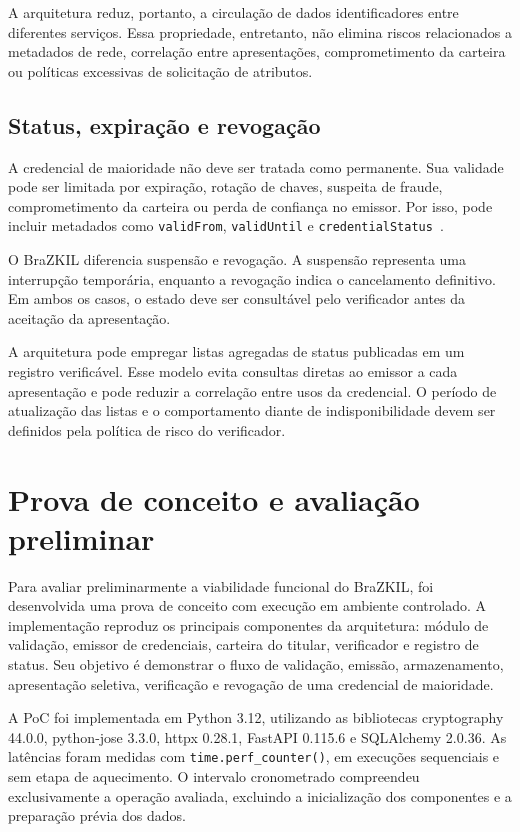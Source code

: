 \documentclass[12pt]{article}
\begin{document}
A arquitetura reduz, portanto, a circulação de dados identificadores entre diferentes serviços. Essa propriedade, entretanto, não elimina riscos relacionados a metadados de rede, correlação entre apresentações, comprometimento da carteira ou políticas excessivas de solicitação de atributos.

\subsection{Status, expiração e revogação}
\label{sec:status-revogacao}

A credencial de maioridade não deve ser tratada como permanente. Sua
validade pode ser limitada por expiração, rotação de chaves, suspeita de
fraude, comprometimento da carteira ou perda de confiança no emissor. Por
isso, pode incluir metadados como \texttt{validFrom},
\texttt{validUntil} e \texttt{credentialStatus}~\cite{w3cvc2025}.

O BraZKIL diferencia suspensão e revogação. A suspensão representa uma
interrupção temporária, enquanto a revogação indica o cancelamento
definitivo. Em ambos os casos, o estado deve ser consultável pelo
verificador antes da aceitação da apresentação.

A arquitetura pode empregar listas agregadas de status publicadas em um
registro verificável. Esse modelo evita consultas diretas ao emissor a cada
apresentação e pode reduzir a correlação entre usos da credencial. O período
de atualização das listas e o comportamento diante de indisponibilidade
devem ser definidos pela política de risco do verificador.
\section{Prova de conceito e avaliação preliminar}
\label{sec:poc}

Para avaliar preliminarmente a viabilidade funcional do BraZKIL, foi desenvolvida uma prova de conceito com execução em ambiente controlado. A implementação reproduz os principais componentes da arquitetura: módulo de validação, emissor de credenciais, carteira do titular, verificador e registro de status. Seu objetivo é demonstrar o fluxo de validação, emissão, armazenamento, apresentação seletiva, verificação e revogação de uma credencial de maioridade.

A PoC foi implementada em Python 3.12, utilizando as bibliotecas cryptography 44.0.0, python-jose 3.3.0, httpx 0.28.1, FastAPI 0.115.6 e SQLAlchemy 2.0.36. As latências foram medidas com \texttt{time.perf\_counter()}, em execuções sequenciais e sem etapa de
aquecimento. O intervalo cronometrado  compreendeu exclusivamente a
operação avaliada, excluindo a inicialização dos componentes e a preparação prévia dos dados.
\end{document}
